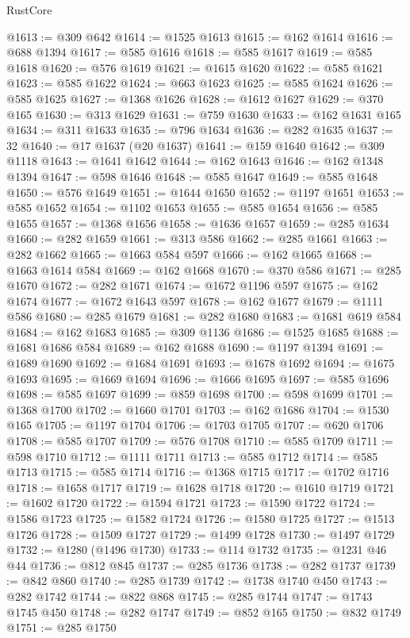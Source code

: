 \begin{lexlean}{RustCore}
\begin{coremodule}
@1613 := @309 @642
@1614 := @1525 @1613
@1615 := @162 @1614
@1616 := @688 @1394
@1617 := @585 @1616
@1618 := @585 @1617
@1619 := @585 @1618
@1620 := @576 @1619
@1621 := @1615 @1620
@1622 := @585 @1621
@1623 := @585 @1622
@1624 := @663 @1623
@1625 := @585 @1624
@1626 := @585 @1625
@1627 := @1368 @1626
@1628 := @1612 @1627
@1629 := @370 @165
@1630 := @313 @1629
@1631 := @759 @1630
@1633 := @162 @1631 @165
@1634 := @311 @1633
@1635 := @796 @1634
@1636 := @282 @1635
@1637 := 32
@1640 := @17 @1637 (@20 @1637)
@1641 := @159 @1640
@1642 := @309 @1118
@1643 := @1641 @1642
@1644 := @162 @1643
@1646 := @162 @1348 @1394
@1647 := @598 @1646
@1648 := @585 @1647
@1649 := @585 @1648
@1650 := @576 @1649
@1651 := @1644 @1650
@1652 := @1197 @1651
@1653 := @585 @1652
@1654 := @1102 @1653
@1655 := @585 @1654
@1656 := @585 @1655
@1657 := @1368 @1656
@1658 := @1636 @1657
@1659 := @285 @1634
@1660 := @282 @1659
@1661 := @313 @586
@1662 := @285 @1661
@1663 := @282 @1662
@1665 := @1663 @584 @597
@1666 := @162 @1665
@1668 := @1663 @1614 @584
@1669 := @162 @1668
@1670 := @370 @586
@1671 := @285 @1670
@1672 := @282 @1671
@1674 := @1672 @1196 @597
@1675 := @162 @1674
@1677 := @1672 @1643 @597
@1678 := @162 @1677
@1679 := @1111 @586
@1680 := @285 @1679
@1681 := @282 @1680
@1683 := @1681 @619 @584
@1684 := @162 @1683
@1685 := @309 @1136
@1686 := @1525 @1685
@1688 := @1681 @1686 @584
@1689 := @162 @1688
@1690 := @1197 @1394
@1691 := @1689 @1690
@1692 := @1684 @1691
@1693 := @1678 @1692
@1694 := @1675 @1693
@1695 := @1669 @1694
@1696 := @1666 @1695
@1697 := @585 @1696
@1698 := @585 @1697
@1699 := @859 @1698
@1700 := @598 @1699
@1701 := @1368 @1700
@1702 := @1660 @1701
@1703 := @162 @1686
@1704 := @1530 @165
@1705 := @1197 @1704
@1706 := @1703 @1705
@1707 := @620 @1706
@1708 := @585 @1707
@1709 := @576 @1708
@1710 := @585 @1709
@1711 := @598 @1710
@1712 := @1111 @1711
@1713 := @585 @1712
@1714 := @585 @1713
@1715 := @585 @1714
@1716 := @1368 @1715
@1717 := @1702 @1716
@1718 := @1658 @1717
@1719 := @1628 @1718
@1720 := @1610 @1719
@1721 := @1602 @1720
@1722 := @1594 @1721
@1723 := @1590 @1722
@1724 := @1586 @1723
@1725 := @1582 @1724
@1726 := @1580 @1725
@1727 := @1513 @1726
@1728 := @1509 @1727
@1729 := @1499 @1728
@1730 := @1497 @1729
@1732 := @1280 (@1496 @1730)
@1733 := @114 @1732
@1735 := @1231 @46 @44
@1736 := @812 @845
@1737 := @285 @1736
@1738 := @282 @1737
@1739 := @842 @860
@1740 := @285 @1739
@1742 := @1738 @1740 @450
@1743 := @282 @1742
@1744 := @822 @868
@1745 := @285 @1744
@1747 := @1743 @1745 @450
@1748 := @282 @1747
@1749 := @852 @165
@1750 := @832 @1749
@1751 := @285 @1750

\end{coremodule}
\end{lexlean}
